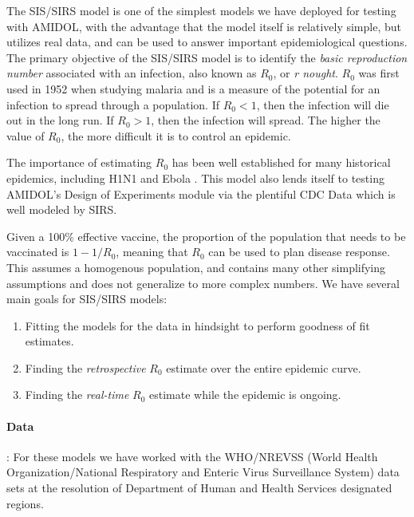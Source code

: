 \documentclass[11pt]{article}
\newcommand{\amidol}{\textsc{AMIDOL}}
\begin{document}
The SIS/SIRS model is one of the simplest models we have deployed for testing with \amidol{}, with the advantage that the model itself is relatively simple, but utilizes real data, and can be used to answer important epidemiological questions.  The primary objective of the SIS/SIRS model is to identify the \emph{basic reproduction number} associated with an infection, also known as $R_0$, or \emph{r nought}.  $R_0$ was first used in 1952 when studying malaria and is a measure of the potential for an infection to spread through a population.  If $R_0 < 1$, then the infection will die out in the long run.  If $R_0 > 1$, then the infection will spread.  The higher the value of $R_0$, the more difficult it is to control an epidemic.

The importance of estimating $R_0$ has been well established for many historical epidemics, including H1N1 \cite{fraser2009pandemic} and Ebola \cite{fisman2014early}.  This model also lends itself to testing \amidol{}'s Design of Experiments module via the plentiful CDC Data \cite{cdc2019fluview} which is well modeled by SIRS.

Given a 100\% effective vaccine, the proportion of the population that needs to be vaccinated is $1 - 1/R_0$, meaning that $R_0$ can be used to plan disease response.  This assumes a homogenous population, and contains many other simplifying assumptions and does not generalize to more complex numbers.  We have several main goals for SIS/SIRS models:

\begin{enumerate}
\item Fitting the models for the data in hindsight to perform goodness of fit estimates.
\item Finding the \emph{retrospective} $R_0$ estimate over the entire epidemic curve.
\item Finding the \emph{real-time} $R_0$ estimate while the epidemic is ongoing.
\end{enumerate}

\paragraph{Data}: For these models we have worked with the WHO/NREVSS (World Health Organization/National Respiratory and Enteric Virus Surveillance System) data sets at the resolution of Department of Human and Health Services designated regions.
\end{document}
